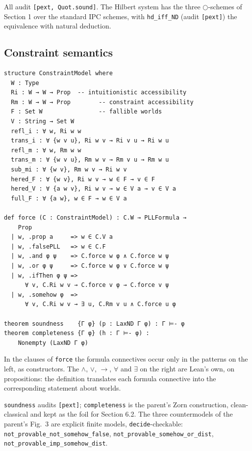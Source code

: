 \noindent All audit \texttt{[pext, Quot.sound]}. The Hilbert system
has the three \ensuremath{\bigcirc}-schemes of Section 1 over the standard IPC
schemes, with \texttt{hd\_iff\_ND} (audit \texttt{[pext]}) the
equivalence with natural deduction.

\subsection{Constraint semantics}

\begin{lstlisting}
structure ConstraintModel where
  W : Type
  Ri : W → W → Prop  -- intuitionistic accessibility
  Rm : W → W → Prop        -- constraint accessibility
  F : Set W                -- fallible worlds
  V : String → Set W
  refl_i : ∀ w, Ri w w
  trans_i : ∀ {w v u}, Ri w v → Ri v u → Ri w u
  refl_m : ∀ w, Rm w w
  trans_m : ∀ {w v u}, Rm w v → Rm v u → Rm w u
  sub_mi : ∀ {w v}, Rm w v → Ri w v
  hered_F : ∀ {w v}, Ri w v → w ∈ F → v ∈ F
  hered_V : ∀ {a w v}, Ri w v → w ∈ V a → v ∈ V a
  full_F : ∀ {a w}, w ∈ F → w ∈ V a

def force (C : ConstraintModel) : C.W → PLLFormula →
    Prop
  | w, .prop a     => w ∈ C.V a
  | w, .falsePLL   => w ∈ C.F
  | w, .and φ ψ    => C.force w φ ∧ C.force w ψ
  | w, .or φ ψ     => C.force w φ ∨ C.force w ψ
  | w, .ifThen φ ψ =>
      ∀ v, C.Ri w v → C.force v φ → C.force v ψ
  | w, .somehow φ  =>
      ∀ v, C.Ri w v → ∃ u, C.Rm v u ∧ C.force u φ

theorem soundness    {Γ φ} (p : LaxND Γ φ) : Γ ⊨- φ
theorem completeness {Γ φ} (h : Γ ⊨- φ) :
    Nonempty (LaxND Γ φ)
\end{lstlisting}

\noindent In the clauses of \texttt{force} the formula connectives occur only
in the patterns on the left, as constructors. The \ensuremath{\wedge}, \ensuremath{\vee},
\ensuremath{\to}, \ensuremath{\forall} and \ensuremath{\exists} on the right are Lean's own, on
propositions: the definition translates each formula connective into the
corresponding statement about worlds.

\noindent \texttt{soundness} audits \texttt{[pext]};
\texttt{completeness} is the parent's Zorn construction, clean-classical
and kept as the foil for Section 6.2. The three countermodels of the
parent's Fig.~3 are explicit finite models, \texttt{decide}-checkable:
\texttt{not\_provable\_not\_somehow\_false},
\texttt{not\_provable\_somehow\_or\_dist},
\texttt{not\_provable\_imp\_somehow\_dist}.

